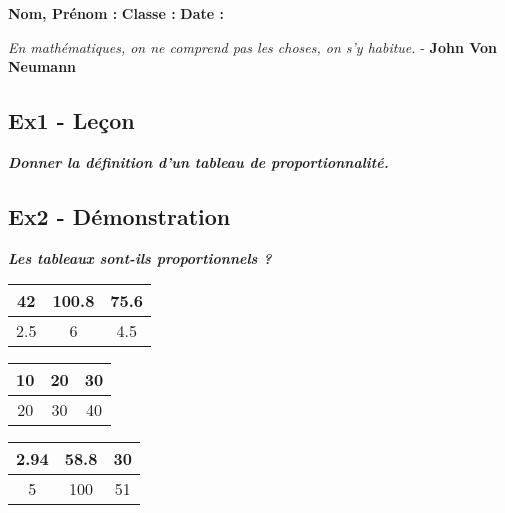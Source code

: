 \documentclass[12pt]{article}
\newcommand{\Pointilles}[1][3]{%
  \multido{}{#1}{\makebox[\linewidth]{\dotfill}\\[\parskip]
}}
\begin{document}
\textbf{Nom, Prénom :} \hspace{8cm} \textbf{Classe :} \hspace{3cm} \textbf{Date :}\\

\begin{center}
  \textit{En mathématiques, on ne comprend pas les choses, on s'y habitue.}  - \textbf{John Von Neumann}
\end{center}

\subsection*{Ex1 - Leçon}

\textit{\textbf{Donner la définition d'un tableau de proportionnalité.}}

\Pointilles[4]

\subsection*{Ex2 - Démonstration}

\textit{\textbf{Les tableaux sont-ils proportionnels ?}}

\begin{multicols}{3}

  \begin{center}
      \begin{tabular}{|c|c|c|}
        \hline
        42 & 100.8 & 75.6 \\  \hline
        2.5 & 6 & 4.5 \\  \hline
      \end{tabular}
    \end{center}

    \Pointilles[6]

    \begin{center}
      \begin{tabular}{|c|c|c|}
        \hline
        10 & 20 & 30   \\  \hline
        20 & 30 & 40   \\  \hline
      \end{tabular}
    \end{center}

    \Pointilles[6]

    \begin{center}
      \begin{tabular}{|c|c|c|}
        \hline
        2.94 & 58.8 & 30   \\  \hline
           5 &  100 & 51   \\  \hline
      \end{tabular}
    \end{center}    

    \Pointilles[6]

  \end{multicols}
\end{document}
